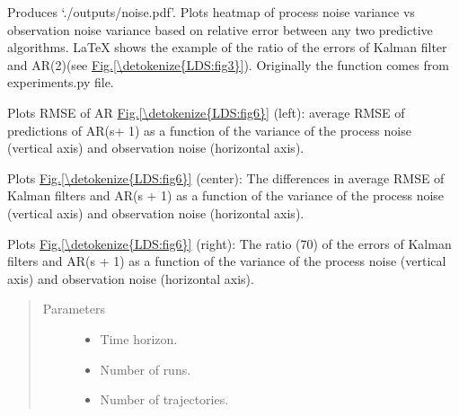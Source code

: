 \documentclass[letterpaper,10pt,english]{sphinxmanual}
\begin{document}
\begin{fulllineitems}
\label{\detokenize{LDS:LDS.OnlineLDS_library.testNoiseImpact}}
\sphinxAtStartPar
Produces ‘./outputs/noise.pdf’. Plots heatmap of process noise variance
vs observation noise variance based on relative error between any two
predictive algorithms. LaTeX shows the example of the ratio of the errors
of Kalman filter and AR(2)(see \hyperref[\detokenize{LDS:fig3}]{Fig.\@ \ref{\detokenize{LDS:fig3}}}).
Originally the function comes from experiments.py file.

\sphinxAtStartPar
Plots RMSE of AR \hyperref[\detokenize{LDS:fig6}]{Fig.\@ \ref{\detokenize{LDS:fig6}}} (left):
average RMSE of predictions of AR(s+ 1) as a function of the variance of the
process noise (vertical axis) and observation noise (horizontal axis).

\sphinxAtStartPar
Plots \hyperref[\detokenize{LDS:fig6}]{Fig.\@ \ref{\detokenize{LDS:fig6}}} (center):
The differences in average RMSE of Kalman filters and AR(s + 1) as a function
of the variance of the process noise (vertical axis) and observation noise (horizontal axis).

\sphinxAtStartPar
Plots \hyperref[\detokenize{LDS:fig6}]{Fig.\@ \ref{\detokenize{LDS:fig6}}} (right):
The ratio (70) of the errors of Kalman filters and AR(s + 1) as a function of
the variance of the process noise (vertical axis) and observation noise (horizontal axis).
\begin{quote}\begin{description}
\item[{Parameters}] \leavevmode\begin{itemize}
\item {} 
\sphinxAtStartPar
{} \textendash{} Time horizon.

\item {} 
\sphinxAtStartPar
{} \textendash{} Number of runs.

\item {} 
\sphinxAtStartPar
{} \textendash{} Number of trajectories.

\end{itemize}

\end{description}\end{quote}

\end{fulllineitems}
\end{document}
